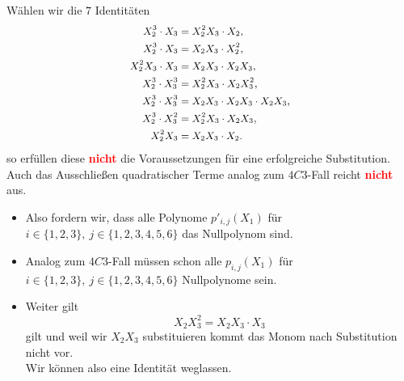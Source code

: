 \documentclass[11pt]{beamer}
\theoremstyle{custom}
\theoremstyle{custom}
\begin{document}
	\begin{frame}
		Wählen wir die $7$ Identitäten
		\begin{equation*}
			\small
		\begin{alignedat}{1}
	X_{2}^{3}\cdot X_{3}	&=  X_{2}^{2}X_{3}\cdot X_{2}, \\
	X_{2}^{3}\cdot X_{3} &=  X_{2}X_{3}\cdot X_{2}^2, \\
	X_{2}^{2}X_{3} \cdot X_{3}	&= X_{2}X_{3} \cdot X_{2}X_{3}, \\
	X_{2}^{3}\cdot X_{3}^3 	&=  X_{2}^{2}X_{3}\cdot X_{2}X_{3}^2, \\
	X_{2}^{3}\cdot X_{3}^3	&=  X_{2}X_{3} \cdot X_{2}X_{3} \cdot X_{2}X_{3}, \\
	X_{2}^{3}\cdot X_{3}^2 	&=  X_{2}^{2}X_{3}\cdot X_{2}X_{3},\\
	X_{2}^{2} X_{3} 	&=  X_{2}X_{3}\cdot X_{2}.
\end{alignedat}
		\end{equation*}
		\pause
		so erfüllen diese \textbf{\textcolor{red}{nicht}} die Voraussetzungen für eine erfolgreiche Substitution.\\
		\pause
		Auch das Ausschließen quadratischer Terme analog zum $4C3$-Fall reicht \textbf{\textcolor{red}{nicht}} aus.
	\end{frame}
	\begin{frame}
			\begin{itemize}
				\item Also fordern wir, dass alle Polynome
				$p'_{i,j}(X_{1})$ für $i \in \{1,2,3\}, \ j \in \{1,2,3,4,5,6\}$ das Nullpolynom sind.
				\pause
				\item Analog zum $4C3$-Fall müssen schon alle $p_{i,j}(X_{1})$ für $i \in \{1,2,3\}, \ j \in \{1,2,3,4,5,6\}$ Nullpolynome sein.
				\pause
				\item Weiter gilt
				\begin{equation*}
					X_{2}X_{3}^2 = X_{2}X_{3} \cdot X_{3}
				\end{equation*}
				gilt und weil wir $X_{2}X_{3}$ substituieren kommt das Monom nach Substitution nicht vor.\\
				Wir können also eine Identität weglassen.
			\end{itemize}
	\end{frame}
\end{document}
